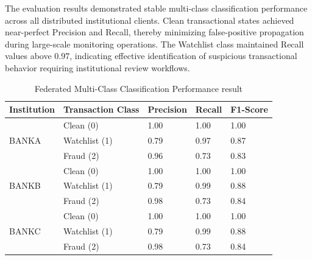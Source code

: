 The evaluation results demonstrated stable multi-class classification performance across all distributed institutional clients. Clean transactional states achieved near-perfect Precision and Recall, thereby minimizing false-positive propagation during large-scale monitoring operations. The Watchlist class maintained Recall values above $0.97$, indicating effective identification of suspicious transactional behavior requiring institutional review workflows.

\begin{table}[H]
\centering
\caption{Federated Multi-Class Classification Performance result}
\vspace{0.3cm}

\renewcommand{\arraystretch}{1.3}

\begin{tabular}{|p{2.2cm}|p{3cm}|p{2cm}|p{2cm}|p{2cm}|}
\hline
\textbf{Institution} & \textbf{Transaction Class} & \textbf{Precision} & \textbf{Recall} & \textbf{F1-Score} \\ \hline

\multirow{3}{*}{BANKA}
& Clean (0) & 1.00 & 1.00 & 1.00 \\ \cline{2-5}
& Watchlist (1) & 0.79 & 0.97 & 0.87 \\ \cline{2-5}
& Fraud (2) & 0.96 & 0.73 & 0.83 \\ \hline

\multirow{3}{*}{BANKB}
& Clean (0) & 1.00 & 1.00 & 1.00 \\ \cline{2-5}
& Watchlist (1) & 0.79 & 0.99 & 0.88 \\ \cline{2-5}
& Fraud (2) & 0.98 & 0.73 & 0.84 \\ \hline

\multirow{3}{*}{BANKC}
& Clean (0) & 1.00 & 1.00 & 1.00 \\ \cline{2-5}
& Watchlist (1) & 0.79 & 0.99 & 0.88 \\ \cline{2-5}
& Fraud (2) & 0.98 & 0.73 & 0.84 \\ \hline

\end{tabular}

\renewcommand{\arraystretch}{1}

\label{tab:model_performance}
\end{table}


